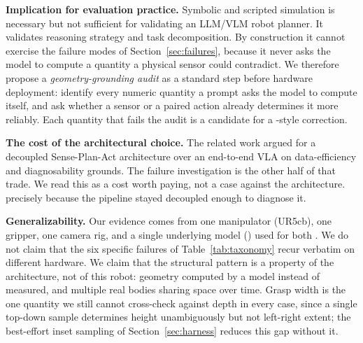 \textbf{Implication for evaluation practice.} Symbolic and scripted
simulation is necessary but not sufficient for validating an LLM/VLM
robot planner. It validates reasoning strategy and task decomposition.
By construction it cannot exercise the failure modes of
Section~\ref{sec:failures}, because it never asks the model to compute
a quantity a physical sensor could contradict. We therefore
propose a \emph{geometry-grounding audit} as a standard step before
hardware deployment: identify every numeric quantity a prompt asks the
model to compute itself, and ask whether a sensor or a paired action
already determines it more reliably. Each quantity that fails the
audit is a candidate for a \harness{}-style correction.

\textbf{The cost of the architectural choice.} The related work argued
for a decoupled Sense-Plan-Act architecture over an end-to-end VLA on
data-efficiency and diagnosability grounds. The failure investigation
is the other half of that trade.  We read this as a cost worth paying, not a case against the
architecture. 
precisely because the pipeline stayed decoupled enough to diagnose it.


\textbf{Generalizability.} Our evidence comes from one manipulator
(UR5cb), one gripper, one camera rig, and a single underlying model
() used for both . We do not
claim that the six specific failures of Table~\ref{tab:taxonomy} recur
verbatim on different hardware. We claim that the structural pattern
is a property of the architecture, not of this robot: geometry
computed by a model instead of measured, and multiple real bodies
sharing space over time. Grasp width is the one quantity we still
cannot cross-check against depth in every case, since a single
top-down sample determines height unambiguously but not left-right
extent; the best-effort inset sampling of Section~\ref{sec:harness}
reduces this gap without  it.
